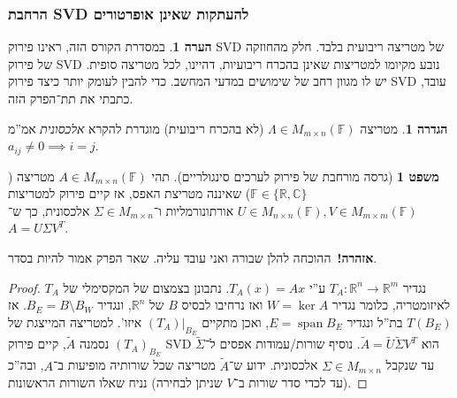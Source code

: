 \documentclass[a4paper]{article}
\newcommand\R     {\mathbb{R}}
\newcommand\C     {\mathbb{C}}
\newcommand\ec    {\mathcal{E}}
\DeclareMathOperator\Img   {Im}
\DeclareMathOperator{\Sp}      {span}
\DeclareMathOperator{\rk}      {rank}
\DeclareMathOperator{\col}     {Col}
\newcommand\F         {\mathbb{F}}
\newcommand\co        {\colon}
\newcommand\Lg        {\Lambda}
\newcommand\Sg        {\Sigma}
\newcommand\tl    {\tilde}
\theoremstyle{definition}
\newtheorem{Theorem}{\color{myblue}משפט}
\newtheorem{Definition}{\color{mygreen}הגדרה}
\newtheorem{Remark}{\color{mycyan}הערה}
\newcommand\defi  [1] {\begin{Definition}#1\end{Definition}}
\newcommand\rmark [1] {\begin{Remark}#1\end{Remark}}
\begin{document}
	\subsubsection{הרחבת SVD להעתקות שאינן אופרטורים}
	\rmark{במסדרת הקורס הזה, ראינו פירוק SVD של מטריצה ריבועית בלבד. חלק מהחוזקה של פירוק SVD נובע מקיומו למטריצות שאינן בהכרח ריבועיות, דהיינו, לכל מטריצה סופית. יש לו מגוון רחב של שימושים במדעי המחשב. כדי להבין לעומק יותר כיצד פירוק SVD עובד, כתבתי את תת־הפרק הזה. }
	\defi{מטריצה $\Lg \in M_{m \times n}(\F)$ (לא בהכרח ריבועית) מוגדרת להקרא \textit{אלכסונית} אמ''מ $a_{ij} \neq 0 \implies i = j$. }
	\begin{Theorem}[גרסה מורחבת של פירוק לערכים סינגולריים]
		תהי $A \in M_{m \times n}(\F)$ מטריצה ($\F\in\{\R, \C\}$) שאיננה מטריצת האפס, אז קיים פירוק למטריצות $U \in M_{n \times n}(\F), V \in M_{m \times m}(\F)$ אורתונורמליות ו־$\Sg \in M_{m \times n}$ אלכסונית, כך ש־$A = U\Sg V^{T}$. 
	\end{Theorem}
	\color{red}\textbf{אזהרה!}\color{black}\, ההוכחה להלן שבורה ואני עובד עליה. שאר הפרק אמור להיות בסדר. 
	\begin{proof}
	נגדיר $T_A \co \R^{n} \to \R^{m}$ ע''י $T_A(x) = Ax$. נתבונן בצמצום של המקסימלי של $T_A$ לאיזומטריה, כלומר נגדיר $W = \ker A$ ואז נרחיבו לבסיס $B$ של $\R^{n}$, ונגדיר $B_E = B \setminus B_W$. אז $T(B_E)$ בת''ל ונגדיר $E = \Sp B_E$, ואכן מתקיים $(T_{A})|_{B_E}$ איזו'. למטריצה המייצגת של $(T_A)_{B_E}$ נסמנה $\tl A$, קיים פירוק SVD הוא $\tl A = \tl U \tl \Sg V^T$. נוסיף שורות/עמודות אפסים ל־$\tl \Sg$ עד שנקבל $\Sg \in M_{m \times n}$ אלכסונית. ידוע ש־$\tl A$ מטריצה שכל שורותיה מופיעות ב־$A$, ובה''כ (עד לכדי סדר שורות ב־$V$ שניתן לבחירה) נניח שאלו השורות הראשונות. 
	\end{proof}
\end{document}

